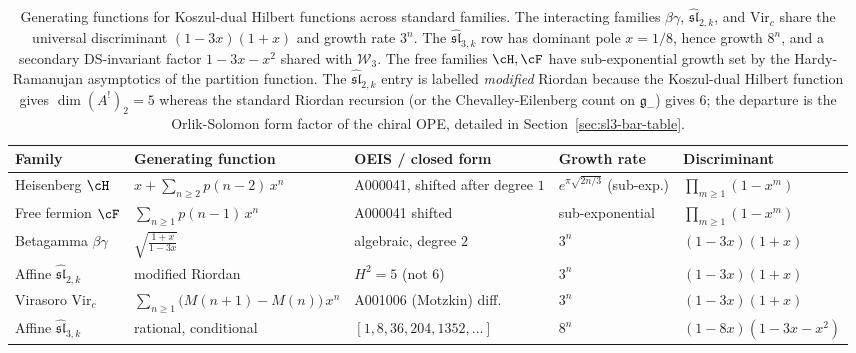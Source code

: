 \begin{table}[h]
\centering
\renewcommand{\arraystretch}{1.3}
\begin{tabular}{@{}lllll@{}}
\toprule
Family & Generating function & OEIS / closed form & Growth rate & Discriminant \\
\midrule
Heisenberg $\cH$ &
$\displaystyle x + \sum_{n \geq 2} p(n{-}2)\, x^n$ &
A000041, shifted after degree $1$ &
$e^{\pi \sqrt{2n/3}}$ (sub-exp.) &
$\prod_{m \geq 1}(1 - x^m)$ \\
Free fermion $\cF$ &
$\displaystyle \sum_{n \geq 1} p(n{-}1)\, x^n$ &
A000041 shifted &
sub-exponential &
$\prod_{m \geq 1}(1 - x^m)$ \\
Betagamma $\beta\gamma$ &
$\displaystyle \sqrt{\frac{1+x}{1-3x}}$ &
algebraic, degree $2$ &
$3^n$ &
$(1 - 3x)(1 + x)$ \\
Affine $\widehat{\mathfrak{sl}}_{2,k}$ &
modified Riordan &
$H^2 = 5$ (not $6$) &
$3^n$ &
$(1 - 3x)(1 + x)$ \\
Virasoro $\mathrm{Vir}_c$ &
$\displaystyle \sum_{n \geq 1}\bigl(M(n{+}1) - M(n)\bigr)\, x^n$ &
A001006 (Motzkin) diff. &
$3^n$ &
$(1 - 3x)(1 + x)$ \\
Affine $\widehat{\mathfrak{sl}}_{3,k}$ &
rational, conditional &
$[1, 8, 36, 204, 1352, \ldots]$ &
$8^n$ &
$(1 - 8x)(1 - 3x - x^2)$ \\
\bottomrule
\end{tabular}
\caption[Koszul-dual Hilbert generating functions across standard families]{Generating functions for Koszul-dual Hilbert functions across standard families. The interacting families $\beta\gamma$, $\widehat{\mathfrak{sl}}_{2,k}$, and $\mathrm{Vir}_c$ share the universal discriminant $(1 - 3x)(1 + x)$ and growth rate $3^n$. The $\widehat{\mathfrak{sl}}_{3,k}$ row has dominant pole $x=1/8$, hence growth $8^n$, and a secondary DS-invariant factor $1 - 3x - x^2$ shared with $\mathcal{W}_3$. The free families $\cH, \cF$ have sub-exponential growth set by the Hardy-Ramanujan asymptotics of the partition function. The $\widehat{\mathfrak{sl}}_{2,k}$ entry is labelled \emph{modified} Riordan because the Koszul-dual Hilbert function gives $\dim(A^!)_2 = 5$ whereas the standard Riordan recursion (or the Chevalley-Eilenberg count on $\mathfrak{g}_-$) gives $6$; the departure is the Orlik-Solomon form factor of the chiral OPE, detailed in Section~\ref{sec:sl3-bar-table}.}
\label{tab:bar-cohomology-gfs}
\end{table}

